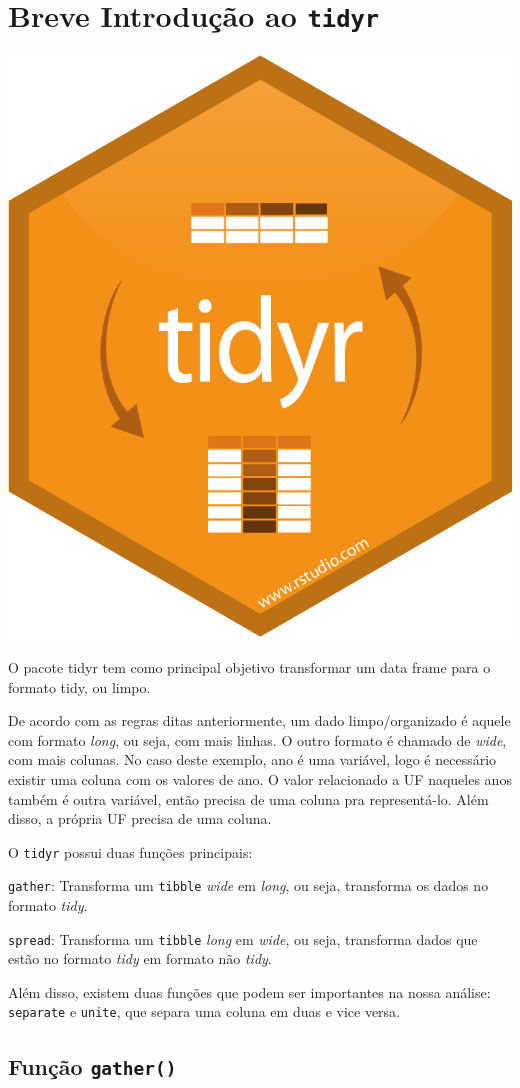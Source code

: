 \documentclass[]{book}
\begin{document}
\hypertarget{breve-introduuxe7uxe3o-ao-tidyr}{%
\section{\texorpdfstring{Breve Introdução ao \texttt{tidyr}}{Breve Introdução ao tidyr}}\label{breve-introduuxe7uxe3o-ao-tidyr}}

\begin{center}\includegraphics[width=0.25\linewidth]{imagens/tidyr} \end{center}

O pacote tidyr tem como principal objetivo transformar um data frame para o formato tidy, ou limpo.

De acordo com as regras ditas anteriormente, um dado limpo/organizado é aquele com formato \emph{long}, ou seja, com mais linhas. O outro formato é chamado de \emph{wide}, com mais colunas. No caso deste exemplo, ano é uma variável, logo é necessário existir uma coluna com os valores de ano. O valor relacionado a UF naqueles anos também é outra variável, então precisa de uma coluna pra representá-lo. Além disso, a própria UF precisa de uma coluna.

O \texttt{tidyr} possui duas funções principais:

\texttt{gather}: Transforma um \texttt{tibble} \emph{wide} em \emph{long}, ou seja, transforma os dados no formato \emph{tidy}.

\texttt{spread}: Transforma um \texttt{tibble} \emph{long} em \emph{wide}, ou seja, transforma dados que estão no formato \emph{tidy} em formato não \emph{tidy}.

Além disso, existem duas funções que podem ser importantes na nossa análise: \texttt{separate} e \texttt{unite}, que separa uma coluna em duas e vice versa.

\hypertarget{funuxe7uxe3o-gather}{%
\subsection{\texorpdfstring{Função \texttt{gather()}}{Função gather()}}\label{funuxe7uxe3o-gather}}
\end{document}
